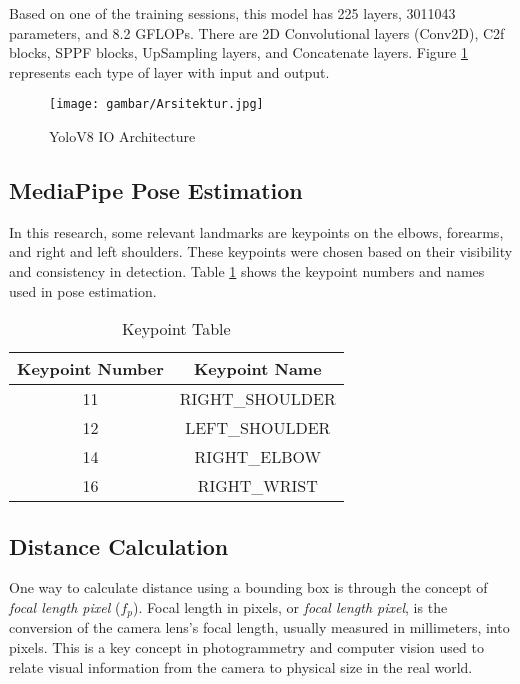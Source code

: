 Based on one of the training sessions, this model has 225 layers, 3011043 parameters, and 8.2 GFLOPs. There are 2D Convolutional layers (Conv2D), C2f blocks, SPPF blocks, UpSampling layers, and Concatenate layers. Figure \ref{fig:YoloV8 IO Architecture} represents each type of layer with input and output.

\begin{figure}[H]
  \centering
  \texttt{[image: gambar/Arsitektur.jpg]}
  \caption{YoloV8 IO Architecture}
  \label{fig:YoloV8 IO Architecture}
\end{figure}

\subsection{MediaPipe Pose Estimation}
In this research, some relevant landmarks are keypoints on the elbows, forearms, and right and left shoulders. These keypoints were chosen based on their visibility and consistency in detection. Table \ref{tb:Keypoint Table} shows the keypoint numbers and names used in pose estimation.

\begin{table}[ht]
  \centering
  \caption{Keypoint Table}
  \label{tb:Keypoint Table}
  \begin{tabular}{|c|c|}
    \hline
    \rowcolor[HTML]{C0C0C0}
    \textbf{Keypoint Number} & \textbf{Keypoint Name} \\
    \hline
    11 & RIGHT\_SHOULDER \\
    12 & LEFT\_SHOULDER \\
    14 & RIGHT\_ELBOW \\
    16 & RIGHT\_WRIST \\
    \hline
  \end{tabular}
\end{table}


\subsection{Distance Calculation}
One way to calculate distance using a bounding box is through the concept of \emph{focal length pixel} ($f_p$). Focal length in pixels, or \emph{focal length pixel}, is the conversion of the camera lens's focal length, usually measured in millimeters, into pixels. This is a key concept in photogrammetry and computer vision used to relate visual information from the camera to physical size in the real world.

